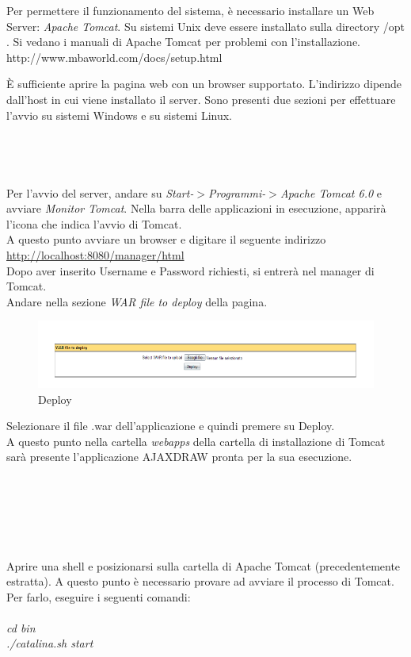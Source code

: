 Per permettere il funzionamento del sistema, \`e necessario installare un Web Server: \textit{Apache Tomcat}. 
Su sistemi Unix deve essere installato sulla directory /opt
. Si vedano i manuali di Apache Tomcat per problemi con l'installazione.
http://www.mbaworld.com/docs/setup.html


\`E sufficiente aprire la pagina web con un browser supportato. L'indirizzo dipende dall'host in cui viene installato il server.
Sono presenti due sezioni per effettuare l'avvio su sistemi Windows e su sistemi Linux.\\
\\\\
\\
\\
Per l'avvio del server, andare su \textit{Start-$ > $Programmi-$ > $Apache Tomcat 6.0} e avviare \textit{Monitor Tomcat}.
Nella barra delle applicazioni in esecuzione, apparir\`a l'icona che indica l'avvio di Tomcat.\\
A questo punto avviare un browser e digitare il seguente indirizzo\\ \href{http://localhost:8080/manager/html}{http://localhost:8080/manager/html}\\
Dopo aver inserito Username e Password richiesti, si entrer\`a nel manager di Tomcat.\\
Andare nella sezione \textit{WAR file to deploy} della pagina.\\

\begin{figure}[!ht]
\centering
\includegraphics[scale=0.7]{images/DeployTomcat.png}
\caption{Deploy}
\end{figure} 

Selezionare il file .war dell'applicazione e quindi premere su Deploy.\\
A questo punto nella cartella \textit{webapps} della cartella di installazione di Tomcat sar\`a presente l'applicazione AJAXDRAW pronta per la sua esecuzione.\\
\\\\
\\\\
\\
\\
Aprire una shell e posizionarsi sulla cartella di Apache Tomcat (precedentemente estratta).
A questo punto \`e necessario provare ad avviare il processo di Tomcat. Per farlo, eseguire i seguenti comandi:\\
\\
\textit{cd bin}\\
\textit{./catalina.sh start}\\

